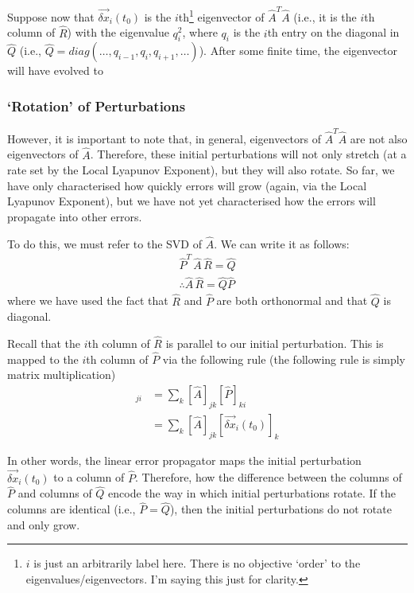 Suppose now that $\vec{\delta x}_i(t_0)$ is the $i$th\footnote{$i$ is just an arbitrarily label here. There is no objective `order' to the eigenvalues/eigenvectors. I'm saying this just for clarity.} eigenvector of $\hat{A}^T\hat{A}$ (i.e., it is the $i$th column of $\hat{R}$) with the eigenvalue $q_i^2$, where $q_i$ is the $i$th entry on the diagonal in $\hat{Q}$ (i.e., $\hat{Q}=diag(\dots,q_{i-1},q_i,q_{i+1},\dots)$). After some finite time, the eigenvector will have evolved to 


\subsubsection{`Rotation' of Perturbations}

However, it is important to note that, in general, eigenvectors of $\hat{A}^T \hat{A}$ are not also eigenvectors of $\hat{A}$. Therefore, these initial perturbations will not only stretch (at a rate set by the Local Lyapunov Exponent), but they will also rotate. So far, we have only characterised how quickly errors will grow (again, via the Local Lyapunov Exponent), but we have not yet characterised how the errors will propagate into other errors.

To do this, we must refer to the SVD of $\hat{A}$. We can write it as follows:
\begin{align*}
    \hat{P}^T \,\hat{A}\,\hat{R}=\hat{Q}
    \\\therefore
    \hat{A}\,\hat{R} = \hat{Q}\hat{P}
\end{align*}
where we have used the fact that $\hat{R}$ and $\hat{P}$ are both orthonormal and that $\hat{Q}$ is diagonal.

Recall that the $i$th column of $\hat{R}$ is parallel to our initial perturbation. This is mapped to the $i$th column of $\hat{P}$ via the following rule (the following rule is simply matrix multiplication)
\begin{align*}
    [\hat{P}]_{ji} &= \sum_{k}[\hat{A}]_{jk}[\hat{P}]_{ki}  
    \\
    &= \sum_{k}[\hat{A}]_{jk}[\vec{\delta x}_i(t_0)]_{k}
\end{align*}

In other words, the linear error propagator maps the initial perturbation $\vec{\delta x}_i(t_0)$ to a column of $\hat{P}$. Therefore, how the difference between the columns of $\hat{P}$ and columns of $\hat{Q}$ encode the way in which initial perturbations rotate. If the columns are identical (i.e., $\hat{P}=\hat{Q}$), then the initial perturbations do not rotate and only grow.

